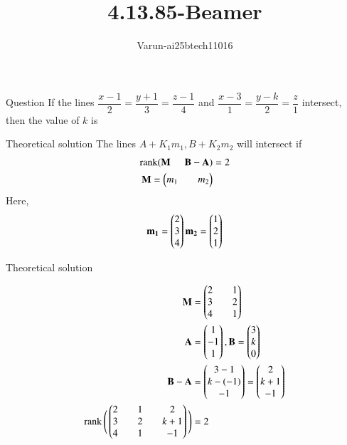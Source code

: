 \documentclass{beamer}
\title %
{4.13.85-Beamer}
\author %
{Varun-ai25btech11016}
\begin{document}
\frame{\titlepage}
\begin{frame}{Question}
If the lines $\dfrac{x-1}{2} = \dfrac{y+1}{3} = \dfrac{z-1}{4}$ 
and $\dfrac{x-3}{1} = \dfrac{y-k}{2} = \dfrac{z}{1}$ intersect, 
then the value of $k$ is

\end{frame}
\begin{frame}{Theoretical solution}
The lines $A+ K_1m_1,B+K_2m_2$ will intersect if 
\begin{align}
\operatorname{rank}(\mathbf{M} \hspace{5mm}  \mathbf{B-A})&=2\\
\mathbf{M}=\begin{pmatrix}m_1&&m_2\end{pmatrix}\\
\end{align}
Here,
\begin{align}
\mathbf{m_1}=\begin{pmatrix}2\\3\\4\end{pmatrix} \mathbf{m_2}=\begin{pmatrix}1\\2\\1\end{pmatrix}
\end{align}
\end{frame}
\begin{frame}{Theoretical solution}

\begin{align}
\mathbf{M}&=\begin{pmatrix}2&&1\\3&&2\\4&&1\end{pmatrix}\\
\mathbf{A}&=\begin{pmatrix}1\\-1\\1\end{pmatrix} ,\mathbf{B}=\begin{pmatrix}3\\k\\0\end{pmatrix}\\
\mathbf{B-A}&=\begin{pmatrix}3-1\\k-(-1)\\-1\end{pmatrix}=\begin{pmatrix}2\\k+1\\-1\end{pmatrix}\\
\operatorname{rank}\Bigg(\begin{pmatrix}2&&1&&2\\3&&2&&k+1\\4&&1&&-1\end{pmatrix}\Bigg)&=2
\end{align}

\end{frame}
\end{document}
